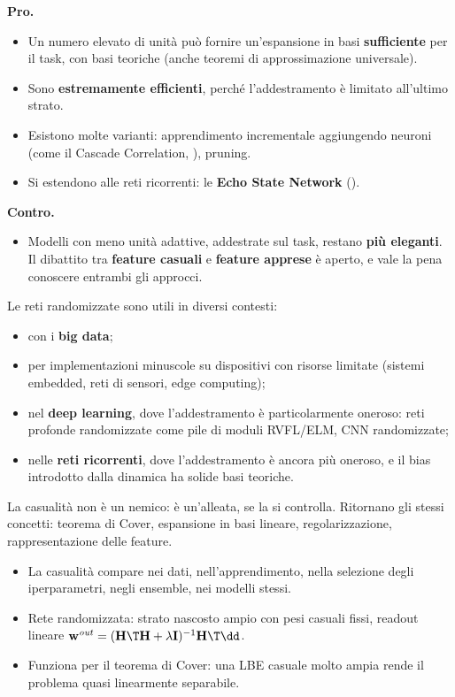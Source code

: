 \textbf{Pro.}
\begin{itemize}
  \item Un numero elevato di unità può fornire un'espansione in basi \textbf{sufficiente} per il task, con basi
        teoriche (anche teoremi di approssimazione universale).
  \item Sono \textbf{estremamente efficienti}, perché l'addestramento è limitato all'ultimo strato.
  \item Esistono molte varianti: apprendimento incrementale aggiungendo neuroni (come il Cascade Correlation,
        ), pruning.
  \item Si estendono alle reti ricorrenti: le \textbf{Echo State Network} ().
\end{itemize}
\textbf{Contro.}
\begin{itemize}
  \item Modelli con meno unità adattive, addestrate sul task, restano \textbf{più eleganti}. Il dibattito tra
        \textbf{feature casuali} e \textbf{feature apprese} è aperto, e vale la pena conoscere entrambi gli
        approcci.
\end{itemize}

Le reti randomizzate sono utili in diversi contesti:
\begin{itemize}
  \item con i \textbf{big data};
  \item per implementazioni minuscole su dispositivi con risorse limitate (sistemi embedded, reti di sensori, edge
        computing);
  \item nel \textbf{deep learning}, dove l'addestramento è particolarmente oneroso: reti profonde randomizzate come
        pile di moduli RVFL/ELM, CNN randomizzate;
  \item nelle \textbf{reti ricorrenti}, dove l'addestramento è ancora più oneroso, e il bias introdotto dalla
        dinamica ha solide basi teoriche.
\end{itemize}

\begin{idea}[Conclusione]
La casualità non è un nemico: è un'alleata, se la si controlla. Ritornano gli stessi concetti: teorema di Cover,
espansione in basi lineare, regolarizzazione, rappresentazione delle feature.
\end{idea}

\begin{puntichiave}
\begin{itemize}
  \item La casualità compare nei dati, nell'apprendimento, nella selezione degli iperparametri, negli ensemble, nei
        modelli stessi.
  \item Rete randomizzata: strato nascosto ampio con pesi casuali fissi, readout lineare
        $\mathbf w^{\mathit{out}} = (\mathbf H\T\mathbf H+\lambda\mathbf I)^{-1}\mathbf H\T\dd$.
  \item Funziona per il teorema di Cover: una LBE casuale molto ampia rende il problema quasi linearmente separabile.
\end{itemize}
\end{puntichiave}


